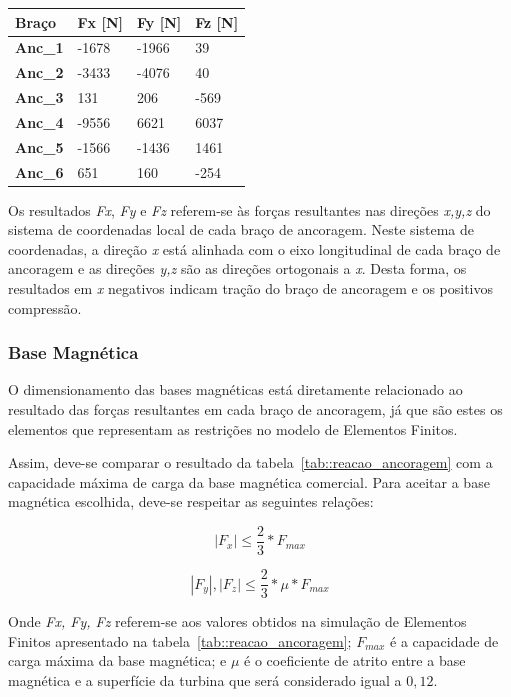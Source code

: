 \begin{center}
\centering
\begin{tabular}{|l|l|l|l|}
\hline
\textbf{Braço}  & \textbf{Fx {[}N{]}} & \textbf{Fy {[}N{]}} & \textbf{Fz {[}N{]}} \\ \hline
\textbf{Anc\_1} & -1678               & -1966               & 39                  \\ \hline
\textbf{Anc\_2} & -3433               & -4076               & 40                  \\ \hline
\textbf{Anc\_3} & 131                 & 206                 & -569                \\ \hline
\textbf{Anc\_4} & -9556               & 6621                & 6037                \\ \hline
\textbf{Anc\_5} & -1566               & -1436               & 1461                \\ \hline
\textbf{Anc\_6} & 651                 & 160                 & -254                \\ \hline
\end{tabular}
\label{tab::reacao_ancoragem}
\end{center}

Os resultados \textit{Fx}, \textit{Fy} e \textit{Fz} referem-se às forças
resultantes nas direções \textit{x,y,z} do sistema de coordenadas local de cada
braço de ancoragem. Neste sistema de coordenadas, a direção \textit{x} está
alinhada com o eixo longitudinal de cada braço de ancoragem e as direções
\textit{y,z} são as direções ortogonais a \textit{x}. 
Desta forma, os resultados em \textit{x} negativos indicam tração do braço de
ancoragem e os positivos compressão.

\subsubsection{Base Magnética}

O dimensionamento das bases magnéticas está diretamente relacionado ao resultado
das forças resultantes em cada braço de ancoragem, já que são estes os elementos
que representam as restrições no modelo de Elementos Finitos.

Assim, deve-se comparar o resultado da tabela~\ref{tab::reacao_ancoragem} com a
capacidade máxima de carga da base magnética comercial. Para aceitar a base
magnética escolhida, deve-se respeitar as seguintes relações:

 \begin{equation*}
	|F_{x}|\leq\frac{2}{3}*F_{max}
\end{equation*}

 \begin{equation*}
	|F_{y}|,|F_{z}|\leq\frac{2}{3}*\mu*F_{max}
\end{equation*}

Onde \textit{Fx, Fy, Fz} referem-se aos valores obtidos na simulação de
Elementos Finitos apresentado na tabela~\ref{tab::reacao_ancoragem};
$F_{max}$ é a capacidade de carga máxima da base magnética; e $\mu$ é o
coeficiente de atrito entre a base magnética e a superfície da turbina que será
considerado igual a $0,12$.

